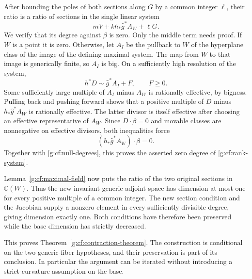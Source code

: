 After bounding the poles of both sections
along $G$ by a common integer $\ell$, their
ratio is a ratio of sections in the single
linear system
\begin{equation}\label{g:cf:rank-system}
 mV+k h_*\widehat g^*A_W+\ell G.
\end{equation}
We verify that its degree against $\beta$ is
zero.  Only the middle term needs proof.
If $W$ is a point it is zero.  Otherwise,
let $A_I$ be the pullback to $W$ of the
hyperplane class of the image of the
defining maximal system.  The map from
$W$ to that image is generically finite,
so $A_I$ is big.  On a sufficiently high
resolution of the system,
\[
 h^*D\sim\widehat g^*A_I+F,
 \qquad F\geq0.
\]
Some sufficiently large multiple of $A_I$
minus $A_W$ is rationally effective, by
bigness.  Pulling back and pushing forward
shows that a positive multiple of $D$
minus $h_*\widehat g^*A_W$ is rationally
effective.  The latter divisor is itself
effective after choosing an effective
representative of $A_W$.  Since
$D\cdot\beta=0$ and movable classes are
nonnegative on effective divisors, both
inequalities force
\[
 (h_*\widehat g^*A_W)\cdot\beta=0.
\]
Together with \eqref{g:cf:null-degrees},
this proves the asserted zero degree of
\eqref{g:cf:rank-system}.

Lemma~\ref{g:cf:maximal-field} now puts
the ratio of the two original sections
in $\mathbb C(W)$.  Thus the new
invariant generic adjoint space has
dimension at most one for every positive multiple of a common integer.  The new section
condition and the Jacobian supply a
nonzero element in every sufficiently
divisible degree, giving dimension
exactly one.  Both conditions have
therefore been preserved while the
base dimension has strictly decreased.

This proves Theorem~\ref{g:cf:contraction-theorem}. The construction is
conditional on the two generic-fiber hypotheses, and their preservation is
part of its conclusion. In particular the argument can be iterated without
introducing a strict-curvature assumption on the base.
